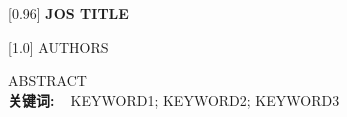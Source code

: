 \documentclass[twoside, UTF8, a4paper]{ctexart}
\begin{document}


\clearpage
\pagestyle{general}
\thispagestyle{firstpage}

\vspace*{-2mm}

\noindent\scalebox{0.96}[0.96]{\heiti{} {\bfseries JOS TITLE}}

\vspace{5mm}


\noindent\scalebox{0.7}[1.0]{\fangsong{} AUTHORS}

\vspace{10mm}


{\kaishu
ABSTRACT
~\\
{\heiti\bfseries 关键词:~~}\kaishu KEYWORD1; KEYWORD2; KEYWORD3
}




\begin{flushleft}
\begin{thebibliography}{0}
\setlength{\parskip}{0pt}
\kaishu{}

\end{thebibliography}
\end{flushleft}
\end{document}
